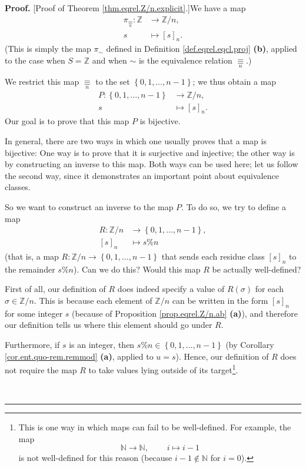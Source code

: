 \documentclass[numbers=enddot,12pt,final,onecolumn,notitlepage]{scrartcl}%
\numberwithin{exer}{subsection}
\theoremstyle{definition}
\newenvironment{proof}[1][Proof]{\noindent\textbf{#1.} }{\ \rule{0.5em}{0.5em}}
\begin{document}
\begin{proof}
[Proof of Theorem \ref{thm.eqrel.Z/n.explicit}.]We have a map%
\begin{align*}
\pi_{\underset{n}{\equiv}}:\mathbb{Z}  &  \rightarrow\mathbb{Z}/n,\\
s  &  \mapsto\left[  s\right]  _{n}.
\end{align*}
(This is simply the map $\pi_{\sim}$ defined in Definition
\ref{def.eqrel.eqcl.proj} \textbf{(b)}, applied to the case when
$S=\mathbb{Z}$ and when $\sim$ is the equivalence relation
$\underset{n}{\equiv}$.)

We restrict this map $\underset{n}{\equiv}$ to the set $\left\{
0,1,\ldots,n-1\right\}  $; we thus obtain a map%
\begin{align*}
P:\left\{  0,1,\ldots,n-1\right\}   &  \rightarrow\mathbb{Z}/n,\\
s  &  \mapsto\left[  s\right]  _{n}.
\end{align*}
Our goal is to prove that this map $P$ is bijective.

In general, there are two ways in which one usually proves that a map is
bijective: One way is to prove that it is surjective and injective; the other
way is by constructing an inverse to this map. Both ways can be used here; let
us follow the second way, since it demonstrates an important point about
equivalence classes.

So we want to construct an inverse to the map $P$. To do so, we try to define
a map%
\begin{align*}
R:\mathbb{Z}/n  &  \rightarrow\left\{  0,1,\ldots,n-1\right\}  ,\\
\left[  s\right]  _{n}  &  \mapsto s\%n
\end{align*}
(that is, a map $R:\mathbb{Z}/n\rightarrow\left\{  0,1,\ldots,n-1\right\}  $
that sends each residue class $\left[  s\right]  _{n}$ to the remainder
$s\%n$). Can we do this? Would this map $R$ be actually well-defined?

First of all, our definition of $R$ does indeed specify a value of $R\left(
\sigma\right)  $ for each $\sigma\in\mathbb{Z}/n$. This is because each
element of $\mathbb{Z}/n$ can be written in the form $\left[  s\right]  _{n}$
for some integer $s$ (because of Proposition \ref{prop.eqrel.Z/n.ab}
\textbf{(a)}), and therefore our definition tells us where this element should
go under $R$.

Furthermore, if $s$ is an integer, then $s\%n\in\left\{  0,1,\ldots
,n-1\right\}  $ (by Corollary \ref{cor.ent.quo-rem.remmod} \textbf{(a)},
applied to $u=s$). Hence, our definition of $R$ does not require the map $R$
to take values lying outside of its target\footnote{This is one way in which
maps can fail to be well-defined. For example, the map
\[
\mathbb{N}\rightarrow\mathbb{N},\ \ \ \ \ \ \ \ \ \ i\mapsto i-1
\]
is not well-defined for this reason (because $i-1\notin\mathbb{N}$ for
$i=0$).}.


\end{proof}
\end{document}
